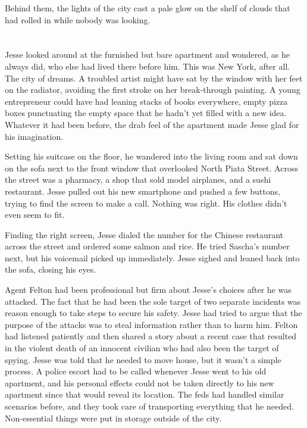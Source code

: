\documentclass[12pt]{book}
\begin{document}
Behind them, the lights of the city cast a pale glow on the shelf of clouds that had rolled in while nobody was looking.

\chapter{}
											
Jesse looked around at the furnished but bare apartment and wondered, as he always did, who else had lived there before him.  This was New York, after all.  The city of dreams.  A troubled artist might have sat by the window with her feet on the radiator, avoiding the first stroke on her break-through painting.  A young entrepreneur could have had leaning stacks of books everywhere, empty pizza boxes punctuating the empty space that he hadn't yet filled with a new idea.  Whatever it had been before, the drab feel of the apartment made Jesse glad for his imagination.

Setting his suitcase on the floor, he wandered into the living room and sat down on the sofa next to the front window that overlooked North Piata Street.  Across the street was a pharmacy, a shop that sold model airplanes, and a sushi restaurant.  Jesse pulled out his new smartphone and pushed a few buttons, trying to find the screen to make a call.  Nothing was right.  His clothes didn't even seem to fit.

Finding the right screen, Jesse dialed the number for the Chinese restaurant across the street and ordered some salmon and rice.  He tried Sascha's number next, but his voicemail picked up immediately.  Jesse sighed and leaned back into the sofa, closing his eyes.

Agent Felton had been professional but firm about Jesse's choices after he was attacked.  The fact that he had been the sole target of two separate incidents was reason enough to take steps to secure his safety.  Jesse had tried to argue that the purpose of the attacks was to steal information rather than to harm him.  Felton had listened patiently and then shared a story about a recent case that resulted in the violent death of an innocent civilian who had also been the target of spying.  Jesse was told that he needed to move house, but it wasn't a simple process.  A police escort had to be called whenever Jesse went to his old apartment, and his personal effects could not be taken directly to his new apartment since that would reveal its location.  The feds had handled similar scenarios before, and they took care of transporting everything that he needed.  Non-essential things were put in storage outside of the city.
\end{document}
